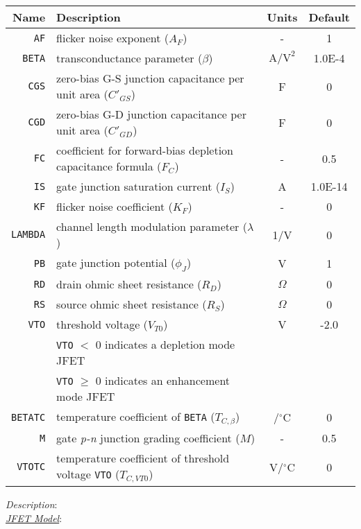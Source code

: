 \begin{tabular}{|r|l|c|c|}
\hline
\textbf{Name} & \textbf{Description} & \textbf{Units} & \textbf{Default} \\
\hline
{\tt AF} & flicker noise exponent ($A_F$) & - & 1 \\
\hline
{\tt BETA} & transconductance parameter ($\beta$) & $\mbox{A/V}^2$ & 1.0E-4 \\
\hline
{\tt CGS} & zero-bias G-S junction capacitance per unit area ($C'_{GS}$) & F & 0 \\
\hline
{\tt CGD} & zero-bias G-D junction capacitance per unit area ($C'_{GD}$) & F & 0 \\
\hline
{\tt FC} & coefficient for forward-bias depletion capacitance formula ($F_C$) & - & 0.5 \\
\hline
{\tt IS}& gate junction saturation current ($I_S$) & A & 1.0E-14 \\
\hline
{\tt KF} & flicker noise coefficient ($K_F$) & - & 0 \\
\hline
{\tt LAMBDA} & channel length modulation parameter ($\lambda$) & 1/V & 0 \\
\hline
{\tt PB} & gate junction potential ($\phi_J$) & V & 1 \\
\hline
{\tt RD} & drain ohmic sheet resistance ($R_D$) & $\Omega$ & 0 \\
\hline
{\tt RS} & source ohmic sheet resistance ($R_S$) & $\Omega$ & 0 \\
\hline
{\tt VTO} & threshold voltage ($V_{T0}$) & V & -2.0 \\
          & {\tt VTO} $<$ 0 indicates a depletion mode JFET & & \\
          & {\tt VTO} $\ge$ 0 indicates an enhancement mode JFET & & \\
\hline
{\tt BETATC}& temperature coefficient of {\tt BETA} ($T_{C,\beta}$) & /$^\circ$C & 0 \\
\hline
{\tt M} & gate {\it p-n} junction grading  coefficient ($M$) & - & 0.5 \\
\hline
{\tt VTOTC}& temperature coefficient of threshold voltage {\tt VTO} ($T_{C,VT0}$) & V/$^\circ$C & 0 \\
\hline
\end{tabular}
\newline
\textit{Description}:\\
\textit{\underline{JFET Model}}:
\newline

